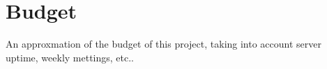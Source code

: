 \chapter{Budget}

An approxmation of the budget of this project, taking into account server uptime, weekly mettings, etc..
